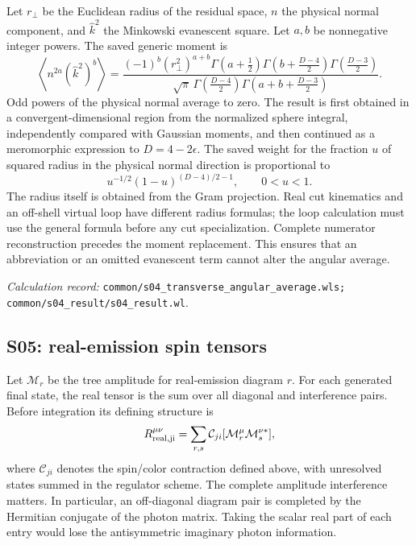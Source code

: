 \documentclass[11pt,a4paper]{article}
\newcommand{\eps}{\epsilon}
\newcommand{\code}[1]{{\small\nolinkurl{#1}}}
\newcommand{\pathref}[1]{\par{\footnotesize\textit{Calculation record:} \code{#1}.}\par}
\begin{document}
Let $r_\perp$ be the Euclidean radius of the residual space, $n$ the physical normal component, and $\widehat k^2$ the Minkowski evanescent square. Let $a,b$ be nonnegative integer powers. The saved generic moment is
\begin{equation}
 \left\langle n^{2a}(\widehat k^2)^b\right\rangle
 =\frac{(-1)^b(r_\perp^2)^{a+b}
 \Gamma(a+\tfrac12)\Gamma(b+\tfrac{D-4}{2})\Gamma(\tfrac{D-3}{2})}
 {\sqrt\pi\,\Gamma(\tfrac{D-4}{2})\Gamma(a+b+\tfrac{D-3}{2})}.
\end{equation}
Odd powers of the physical normal average to zero. The result is first obtained in a convergent-dimensional region from the normalized sphere integral, independently compared with Gaussian moments, and then continued as a meromorphic expression to $D=4-2\eps$. The saved weight for the fraction $u$ of squared radius in the physical normal direction is proportional to
\begin{equation}
 u^{-1/2}(1-u)^{(D-4)/2-1},\qquad 0<u<1.
\end{equation}
The radius itself is obtained from the Gram projection. Real cut kinematics and an off-shell virtual loop have different radius formulas; the loop calculation must use the general formula before any cut specialization. Complete numerator reconstruction precedes the moment replacement. This ensures that an abbreviation or an omitted evanescent term cannot alter the angular average.
\pathref{common/s04_transverse_angular_average.wls; common/s04_result/s04_result.wl}

\subsection{S05: real-emission spin tensors}
Let $\mathcal M_r$ be the tree amplitude for real-emission diagram $r$. For each generated final state, the real tensor is the sum over all diagonal and interference pairs. Before integration its defining structure is
\begin{equation}
 R^{\mu\nu}_{\rm real,ji}
 =\sum_{r,s}\mathcal C_{ji}
       [\mathcal M_r^\mu\mathcal M_s^{\nu *}],
\end{equation}
where $\mathcal C_{ji}$ denotes the spin/color contraction defined above, with unresolved states summed in the regulator scheme. The complete amplitude interference matters. In particular, an off-diagonal diagram pair is completed by the Hermitian conjugate of the photon matrix. Taking the scalar real part of each entry would lose the antisymmetric imaginary photon information.
\end{document}
